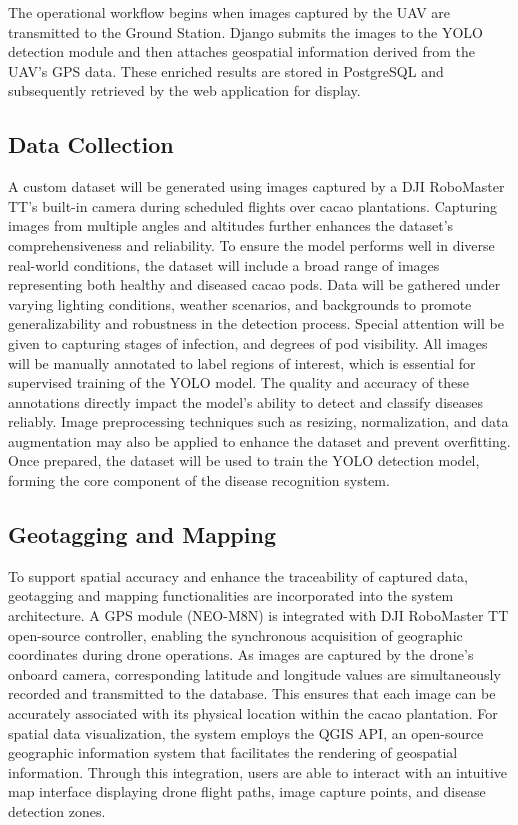 	The operational workflow begins when images captured by the UAV are transmitted to the Ground Station. Django submits the images to the YOLO detection module and then attaches geospatial information derived from the UAV’s GPS data. These enriched results are stored in PostgreSQL and subsequently retrieved by the web application for display.
	
	\subsection{Data Collection}
	A custom dataset will be generated using images captured by a DJI RoboMaster TT’s built-in camera during scheduled flights over cacao plantations. Capturing images from multiple angles and altitudes further enhances the dataset’s comprehensiveness and reliability. To ensure the model performs well in diverse real-world conditions, the dataset will include a broad range of images representing both healthy and diseased cacao pods. Data will be gathered under varying lighting conditions, weather scenarios, and backgrounds to promote generalizability and robustness in the detection process. Special attention will be given to capturing stages of infection, and degrees of pod visibility. All images will be manually annotated to label regions of interest, which is essential for supervised training of the YOLO model. The quality and accuracy of these annotations directly impact the model’s ability to detect and classify diseases reliably. Image preprocessing techniques such as resizing, normalization, and data augmentation may also be applied to enhance the dataset and prevent overfitting. Once prepared, the dataset will be used to train the YOLO detection model, forming the core component of the disease recognition system.
	
	\subsection{Geotagging and Mapping}
	To support spatial accuracy and enhance the traceability of captured data, geotagging and mapping functionalities are incorporated into the system architecture. A GPS module (NEO-M8N) is integrated with DJI RoboMaster TT open-source controller, enabling the synchronous acquisition of geographic coordinates during drone operations. As images are captured by the drone’s onboard camera, corresponding latitude and longitude values are simultaneously recorded and transmitted to the database. This ensures that each image can be accurately associated with its physical location within the cacao plantation. For spatial data visualization, the system employs the QGIS API, an open-source geographic information system that facilitates the rendering of geospatial information. Through this integration, users are able to interact with an intuitive map interface displaying drone flight paths, image capture points, and disease detection zones.
	
